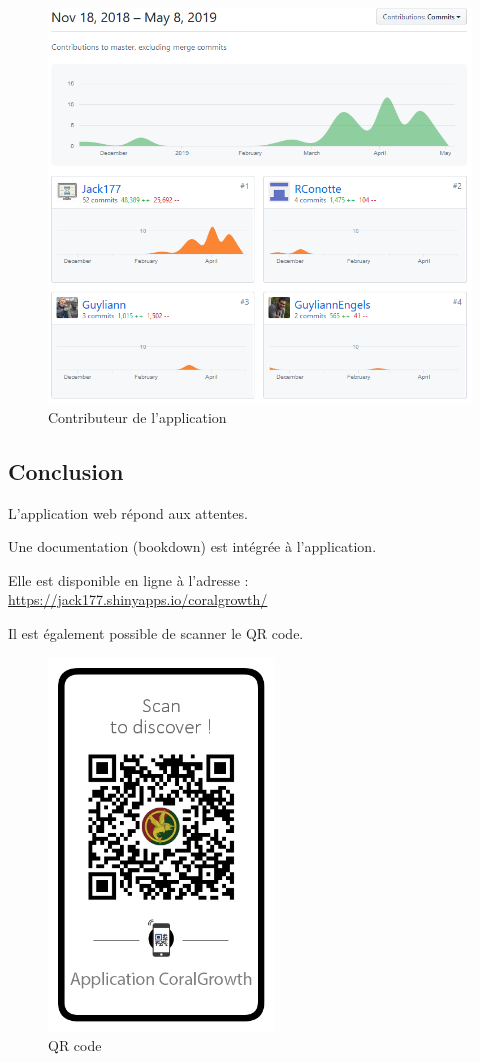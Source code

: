 \documentclass[]{report}
\begin{document}
\begin{figure}
\centering
\includegraphics{../image/github.PNG}
\caption{Contributeur de l'application}
\end{figure}

\subsection{Conclusion}\label{conclusion}

L'application web répond aux attentes.

Une documentation (bookdown) est intégrée à l'application.

Elle est disponible en ligne à l'adresse :
\url{https://jack177.shinyapps.io/coralgrowth/}

Il est également possible de scanner le QR code.

\begin{figure}[h!]
\begin{centering}
\includegraphics[width=6cm]{../image/QRcode.png}
\caption{QR code}
\end{centering}
\end{figure}
\end{document}
